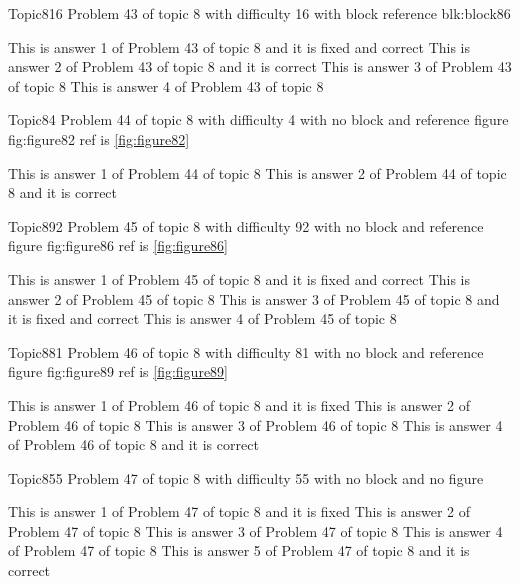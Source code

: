 \documentclass[master]{exam}
\begin{document}
\begin{problem}[requires=blk:block86]{Topic8}{16}
	Problem 43 of topic 8 with difficulty 16 with block reference blk:block86
	\begin{answers}
		 This is answer 1 of Problem 43 of topic 8 and it is fixed and correct
		\answer[correct] This is answer 2 of Problem 43 of topic 8 and it is correct
		\answer This is answer 3 of Problem 43 of topic 8 
		\answer This is answer 4 of Problem 43 of topic 8 
	\end{answers}
\end{problem}

\begin{problem}{Topic8}{4}
	Problem 44 of topic 8 with difficulty 4 with no block and reference figure fig:figure82 ref is \ref{fig:figure82}
	\begin{answers}
		\answer This is answer 1 of Problem 44 of topic 8 
		\answer[correct] This is answer 2 of Problem 44 of topic 8 and it is correct
	\end{answers}
\end{problem}

\begin{problem}{Topic8}{92}
	Problem 45 of topic 8 with difficulty 92 with no block and reference figure fig:figure86 ref is \ref{fig:figure86}
	\begin{answers}
		 This is answer 1 of Problem 45 of topic 8 and it is fixed and correct
		\answer This is answer 2 of Problem 45 of topic 8 
		 This is answer 3 of Problem 45 of topic 8 and it is fixed and correct
		\answer This is answer 4 of Problem 45 of topic 8 
	\end{answers}
\end{problem}

\begin{problem}{Topic8}{81}
	Problem 46 of topic 8 with difficulty 81 with no block and reference figure fig:figure89 ref is \ref{fig:figure89}
	\begin{answers}
		\answer[fixed] This is answer 1 of Problem 46 of topic 8 and it is fixed
		\answer This is answer 2 of Problem 46 of topic 8 
		\answer This is answer 3 of Problem 46 of topic 8 
		\answer[correct] This is answer 4 of Problem 46 of topic 8 and it is correct
	\end{answers}
\end{problem}

\begin{problem}{Topic8}{55}
	Problem 47 of topic 8 with difficulty 55 with no block and no figure
	\begin{answers}
		\answer[fixed] This is answer 1 of Problem 47 of topic 8 and it is fixed
		\answer This is answer 2 of Problem 47 of topic 8 
		\answer This is answer 3 of Problem 47 of topic 8 
		\answer This is answer 4 of Problem 47 of topic 8 
		\answer[correct] This is answer 5 of Problem 47 of topic 8 and it is correct
	\end{answers}
\end{problem}
\end{document}
